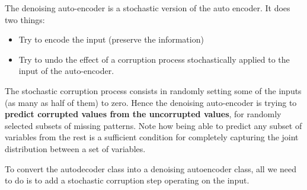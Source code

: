 The denoising auto-encoder is a stochastic version of the auto encoder.
It does two things:
\begin{itemize}
    \item Try to encode the input (preserve the information)
    \item Try to undo the effect of a corruption process stochastically
        applied to the input of the auto-encoder.
\end{itemize}

The stochastic corruption process consists in randomly setting some of
the inputs (as many as half of them) to zero. Hence the denoising
auto-encoder is trying to \textbf{predict corrupted values from the
uncorrupted values}, for randomly selected subsets of missing patterns.
Note how being able to predict any subset of variables from the rest is a
sufficient condition for completely capturing the joint distribution
between a set of variables.

To convert the autodecoder class into a denoising autoencoder class, all
we need to do is to add a stochastic corruption step operating on the
input.


